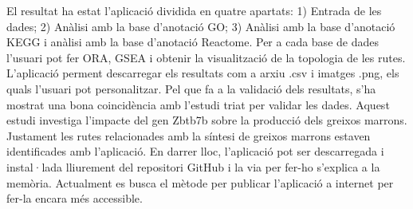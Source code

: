 El resultat ha estat l'aplicació dividida en quatre apartats: 1) Entrada de les dades; 2) Anàlisi amb la base d'anotació GO; 3) Anàlisi amb la base d'anotació \gls{KEGG} i anàlisi amb la base d'anotació Reactome. Per a cada base de dades l'usuari pot fer \gls{ORA}, \gls{GSEA} i obtenir la visualització de la topologia de les rutes. L'aplicació perment descarregar els resultats com a arxiu .csv i imatges .png, els quals l'usuari pot personalitzar. 
Pel que fa a la validació dels resultats, s’ha mostrat una bona coincidència amb l'estudi triat per validar les dades. Aquest estudi investiga l'impacte del gen Zbtb7b sobre la producció dels greixos marrons. Justament les rutes relacionades amb la síntesi de greixos marrons estaven identificades amb l'aplicació. En darrer lloc, l'aplicació pot ser descarregada i instal·lada lliurement del repositori GitHub i la via per fer-ho s'explica a la memòria. Actualment es busca el mètode per publicar l'aplicació a internet per fer-la encara més accessible.

